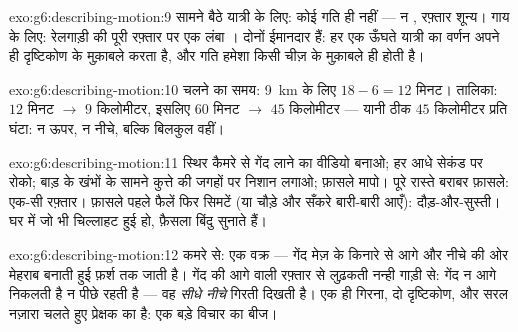 \begin{solution}{exo:g6:describing-motion:9}
सामने बैठे यात्री के लिए: कोई गति ही नहीं --- न , रफ़्तार शून्य।
गाय के लिए: रेलगाड़ी की पूरी रफ़्तार पर एक लंबा ।
दोनों ईमानदार हैं: हर एक ऊँघते यात्री का वर्णन अपने ही दृष्टिकोण के
मुक़ाबले करता है, और गति हमेशा किसी चीज़ के मुक़ाबले ही होती है।
\end{solution}

\begin{solution}{exo:g6:describing-motion:10}
चलने का समय: \qty{9}{km} के लिए $18 - 6 = 12$ मिनट। तालिका: $12$
मिनट $\to$ $9$ किलोमीटर, इसलिए $60$ मिनट $\to$ $45$ किलोमीटर ---
यानी ठीक $45$ किलोमीटर प्रति घंटा: न ऊपर, न नीचे, बल्कि बिलकुल वहीं।
\end{solution}

\begin{solution}{exo:g6:describing-motion:11}
स्थिर कैमरे से गेंद लाने का वीडियो बनाओ; हर आधे सेकंड पर रोको; बाड़ के
खंभों के सामने कुत्ते की जगहों पर निशान लगाओ; फ़ासले मापो। पूरे रास्ते
बराबर फ़ासले: एक-सी रफ़्तार। फ़ासले पहले फैलें फिर सिमटें (या चौड़े और
सँकरे बारी-बारी आएँ): दौड़-और-सुस्ती। घर में जो भी चिल्लाहट हुई हो,
फ़ैसला बिंदु सुनाते हैं।
\end{solution}

\begin{solution}{exo:g6:describing-motion:12}
कमरे से: एक वक्र --- गेंद मेज़ के किनारे से आगे और नीचे की ओर मेहराब
बनाती हुई फ़र्श तक जाती है। गेंद की आगे वाली रफ़्तार से लुढ़कती नन्ही
गाड़ी से: गेंद न आगे निकलती है न पीछे रहती है --- वह \emph{सीधे नीचे}
गिरती दिखती है। एक ही गिरना, दो दृष्टिकोण, और सरल नज़ारा चलते हुए
प्रेक्षक का है: एक बड़े विचार का बीज।
\end{solution}

